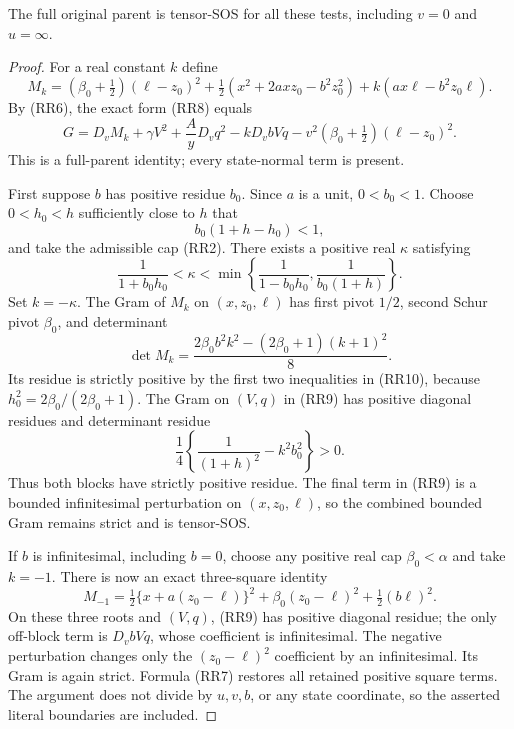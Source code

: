 \begin{proposition}
The full original parent is tensor-SOS for all these tests, including
$v=0$ and $u=\infty$.
\end{proposition}
\begin{proof}
For a real constant $k$ define
\[
 M_k=(\beta_0+\tfrac12)(\ell-z_0)^2
 +\tfrac12(x^2+2axz_0-b^2z_0^2)
 +k(ax\ell-b^2z_0\ell).
\]
By (RR6), the exact form (RR8) equals
\[
 \boxed{G=D_vM_k+
 \gamma V^2+\frac AyD_vq^2-kD_vbVq
 -v^2(\beta_0+\tfrac12)(\ell-z_0)^2.}                   \tag{RR9}
\]
This is a full-parent identity; every state-normal term is present.

First suppose $b$ has positive residue $b_0$.  Since $a$ is a unit,
$0<b_0<1$.  Choose $0<h_0<h$ sufficiently close to $h$ that
\[
 b_0(1+h-h_0)<1,
\]
and take the admissible cap (RR2).  There exists a positive real
$\kappa$ satisfying
\[
 \frac1{1+b_0h_0}<\kappa<
 \min\left\{\frac1{1-b_0h_0},\frac1{b_0(1+h)}\right\}.
                                                               \tag{RR10}
\]
Set $k=-\kappa$.  The Gram of $M_k$ on $(x,z_0,\ell)$ has
first pivot $1/2$, second Schur pivot $\beta_0$, and determinant
\[
 \det M_k=\frac{2\beta_0 b^2k^2-(2\beta_0+1)(k+1)^2}{8}.
                                                               \tag{RR11}
\]
Its residue is strictly positive by the first two inequalities in
(RR10), because $h_0^2=2\beta_0/(2\beta_0+1)$.  The Gram on $(V,q)$
in (RR9) has positive diagonal residues and determinant residue
\[
 \frac14\left\{\frac1{(1+h)^2}-k^2b_0^2\right\}>0.       \tag{RR12}
\]
Thus both blocks have strictly positive residue.  The final term in
(RR9) is a bounded infinitesimal perturbation on $(x,z_0,\ell)$,
so the combined bounded Gram remains strict and is tensor-SOS.

If $b$ is infinitesimal, including $b=0$, choose any positive real
cap $\beta_0<\alpha$ and take $k=-1$.  There is now an exact
three-square identity
\[
 M_{-1}=\tfrac12\{x+a(z_0-\ell)\}^2
       +\beta_0(z_0-\ell)^2+\tfrac12(b\ell)^2.           \tag{RR13}
\]
On these three roots and $(V,q)$, (RR9) has positive diagonal
residue; the only off-block term is $D_vbVq$, whose coefficient
is infinitesimal.  The negative perturbation changes only the
$(z_0-\ell)^2$ coefficient by an infinitesimal.  Its Gram is again
strict.  Formula (RR7) restores all retained positive square terms.
The argument does not divide by $u,v,b$, or any state coordinate,
so the asserted literal boundaries are included.
\end{proof}

